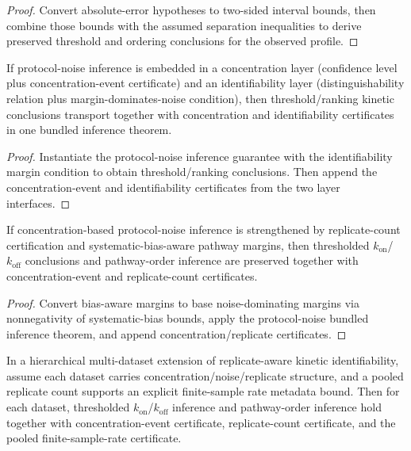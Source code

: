 \begin{proof}
Convert absolute-error hypotheses to two-sided interval bounds, then combine those bounds with the assumed separation inequalities to derive preserved threshold and ordering conclusions for the observed profile.
\end{proof}

\begin{theorem}\label{thm:kinetic-concentration-identifiability-bridge}
If protocol-noise inference is embedded in a concentration layer (confidence level plus concentration-event certificate) and an identifiability layer (distinguishability relation plus margin-dominates-noise condition), then threshold/ranking kinetic conclusions transport together with concentration and identifiability certificates in one bundled inference theorem.
\end{theorem}

\begin{proof}
Instantiate the protocol-noise inference guarantee with the identifiability margin condition to obtain threshold/ranking conclusions. Then append the concentration-event and identifiability certificates from the two layer interfaces.
\end{proof}

\begin{theorem}\label{thm:kinetic-replicate-identifiability-bundle}
If concentration-based protocol-noise inference is strengthened by replicate-count certification and systematic-bias-aware pathway margins, then thresholded $k_{\mathrm{on}}$/$k_{\mathrm{off}}$ conclusions and pathway-order inference are preserved together with concentration-event and replicate-count certificates.
\end{theorem}

\begin{proof}
Convert bias-aware margins to base noise-dominating margins via nonnegativity of systematic-bias bounds, apply the protocol-noise bundled inference theorem, and append concentration/replicate certificates.
\end{proof}

\begin{theorem}\label{thm:hierarchical-kinetic-replicate-inference-bundle}
In a hierarchical multi-dataset extension of replicate-aware kinetic identifiability, assume each dataset carries concentration/noise/replicate structure, and a pooled replicate count supports an explicit finite-sample rate metadata bound. Then for each dataset, thresholded $k_{\mathrm{on}}$/$k_{\mathrm{off}}$ inference and pathway-order inference hold together with concentration-event certificate, replicate-count certificate, and the pooled finite-sample-rate certificate.
\end{theorem}

